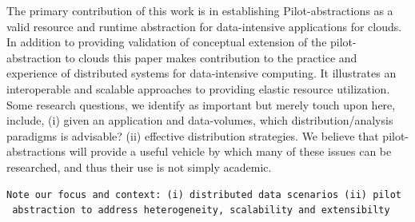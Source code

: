 \documentclass[times]{cpeauth}
\newcommand{\pilot}{Pilot\xspace}
\begin{document}


The primary contribution of this work is in establishing
\pilot-abstractions as a valid resource and runtime abstraction for
data-intensive applications for clouds.  In addition to providing
validation of conceptual extension of the pilot-abstraction to clouds
this paper makes contribution to the practice and experience of
distributed systems for data-intensive computing. It illustrates an
interoperable and scalable approaches to providing elastic resource
utilization. Some research questions, we identify as important but
merely touch upon here, include, (i) given an application and
data-volumes, which distribution/analysis paradigms is advisable?
(ii) effective distribution strategies. We believe that
pilot-abstractions will provide a useful vehicle by which many of
these issues can be researched, and thus their use is not simply
academic.




\begin{verbatim}
Note our focus and context: (i) distributed data scenarios (ii) pilot
 abstraction to address heterogeneity, scalability and extensibilty
\end{verbatim}
\end{document}
